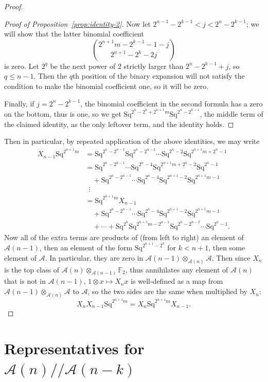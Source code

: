 \documentclass{article}
\newcommand{\A}{\mathcal{A}}
\newcommand{\F}{\mathbb{F}}
\newcommand{\Sq}{\mathrm{Sq}}
\newcommand{\mmod}{/\!/\!}
\begin{document}
\begin{proof}
\begin{proof}[Proof of Proposition~\ref{prop:identity-2}]
    Now let $2^{n-1}-2^{k-1}<j<2^n-2^{k-1}$; we will show that the latter binomial coefficient
    \[\binom{2^{n+1}m-2^{k-1}-1-j}{2^{n+1}-2^k-2j}\]
    is zero.  Let $2^q$ be the next power of $2$ strictly larger than $2^n-2^{k-1}+j$, so $q\leq n-1$.  Then the $q$th position of the binary expansion will not satisfy the condition to make the binomial coefficient one, so it will be zero.

    Finally, if $j=2^n-2^{k-1}$, the binomial coefficient in the second formula has a zero on the bottom, thus is one, so we get $\Sq^{2^n-2^k+2^{n+1}m}\Sq^{2^n-2^{k-1}}$, the middle term of the claimed identity, as the only leftover term, and the identity holds.
  \end{proof}

  Then in particular, by repeated application of the above identities, we may write
  \begin{align*}
    X_{n-1}\Sq^{2^{n+1}m} &= \Sq^{2^n-2^{n-1}}\Sq^{2^n-2^{n-2}}\cdots\Sq^{2^n-2}\Sq^{2^{n+1}m+2^n-1} \\
      &= \Sq^{2^n-2^{n-1}}\cdots\Sq^{2^n-4}\Sq^{2^{n+1}m+2^n-2}\Sq^{2^n-1} \\
      &\quad + \Sq^{2^n-2^{n-1}}\cdots\Sq^{2^n-4}\Sq^{2^{n+1}-2}\Sq^{2^{n+1}m-1}\\
      &\ \;\vdots \\
      &=\Sq^{2^{n+1}m}X_{n-1}\\
      &\quad + \Sq^{2^n-2^{n-1}}\cdots\Sq^{2^n-4}\Sq^{2^{n+1}-2}\Sq^{2^{n+1}m-1}\\
      &\quad + \cdots + \Sq^{2^n}\Sq^{2^{n+1}m-2^{n-1}}\Sq^{2^n-2^{n-2}}\cdots\Sq^{2^n-1}.
  \end{align*}
  Now all of the extra terms are products of (from left to right) an element of $\A(n-1)$, then an element of the form $\Sq^{2^{n+1}-2^k}$ for $k<n+1$, then some element of $\A$.  In particular, they are zero in $\A(n-1)\otimes_{\A(n)}\A$.  Then since $X_n$ is the top class of $\A(n)\otimes_{\A(n-1)}\F_2$, thus annihilates any element of $\A(n)$ that is not in $\A(n-1)$, $1\otimes x\mapsto X_nx$ is well-defined as a map from $\A(n-1)\otimes_{\A(n)}\A$ to $\A$, so the two sides are the same when multiplied by $X_n$:
  \[X_nX_{n-1}\Sq^{2^{n+1}m} = X_n\Sq^{2^{n+1}m}X_{n-1}.\]

\end{proof}

\section{Representatives for \boldmath$\A(n)\mmod\A(n-k)$}
\end{document}
